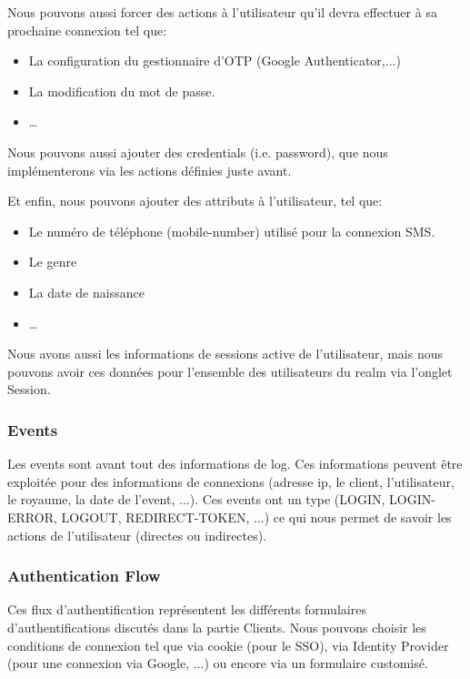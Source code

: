 Nous pouvons aussi forcer des actions à l'utilisateur qu'il devra effectuer à sa prochaine connexion tel
que:

\begin{itemize}
    \item La configuration du gestionnaire d'OTP (Google Authenticator,...)
    \item La modification du mot de passe.
    \item \dots
\end{itemize}

Nous pouvons aussi ajouter des credentials (i.e. password), que nous implémenterons via les actions définies juste
avant.

Et enfin, nous pouvons ajouter des attributs à l'utilisateur, tel que:

\begin{itemize}
    \item Le numéro de téléphone (mobile-number) utilisé pour la connexion SMS.
    \item Le genre
    \item La date de naissance
    \item \dots
\end{itemize}

Nous avons aussi les informations de sessions active de l'utilisateur, mais nous pouvons avoir ces
données pour l'ensemble des utilisateurs du realm via l'onglet Session.

\subsubsection{Events}

Les events sont avant tout des informations de log. Ces informations peuvent être exploitée pour des
informations de connexions (adresse ip, le client, l'utilisateur, le royaume, la date de l'event, ...). Ces
events ont un type (LOGIN, LOGIN-ERROR, LOGOUT, REDIRECT-TOKEN, ...) ce qui nous permet de
savoir les actions de l'utilisateur (directes ou indirectes).

\subsubsection{Authentication Flow}

Ces flux d'authentification représentent les différents formulaires d'authentifications discutés dans la
partie Clients. Nous pouvons choisir les conditions de connexion tel que via cookie (pour le SSO), via
Identity Provider (pour une connexion via Google, ...) ou encore via un formulaire customisé.

